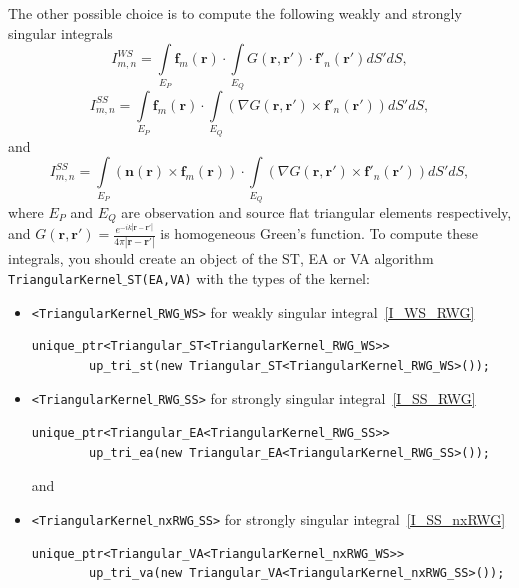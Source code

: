 \documentclass[a4wide,11pt]{article}
\renewcommand{\[}{\begin{equation}}
\renewcommand{\]}{\end{equation}}
\renewcommand{\{}{\begin{eqnarray}}
\renewcommand{\}}{\end{eqnarray}}
\renewcommand{\vec}{\mathbf}
\begin{document}
The other possible choice is to compute the following weakly and strongly singular integrals
\[
\label{I_WS_RWG}
I^{WS}_{m,n} = \int\limits_{E_P} \vec f_m(\vec r) \cdot\int\limits_{E_Q}  G(\vec r, \vec r') \cdot\vec f'_n(\vec r') dS' dS,
\]
\[
\label{I_SS_RWG}
I^{SS}_{m,n} = \int\limits_{E_P} \vec f_m(\vec r) \cdot\int\limits_{E_Q} (\nabla G(\vec r, \vec r') \times \vec f'_n(\vec r')) dS' dS,
\]
and
\[
\label{I_SS_nxRWG}
I^{SS}_{m,n} = \int\limits_{E_P} \left(\vec n(\vec r) \times\vec f_m(\vec r)\right) \cdot\int\limits_{E_Q} (\nabla G(\vec r, \vec r') \times \vec f'_n(\vec r')) dS' dS,
\]
where $E_P$ and $E_Q$ are observation and source flat triangular elements respectively, and $G(\vec r, \vec r') = \frac{e^{-ik|\vec r - \vec r'|}}{4\pi |\vec r - \vec r'|}$ is homogeneous Green's function. To compute these integrals, you should create an object of the ST, EA or VA algorithm \texttt{TriangularKernel$\_$ST(EA,VA)} with the types of the kernel: \\
\begin{itemize}
\item       
\texttt{<TriangularKernel$\_$RWG$\_$WS>} for weakly singular integral~\eqref{I_WS_RWG}
\begin{verbatim}
unique_ptr<Triangular_ST<TriangularKernel_RWG_WS>> 
        up_tri_st(new Triangular_ST<TriangularKernel_RWG_WS>());
\end{verbatim}
\item
\texttt{<TriangularKernel$\_$RWG$\_$SS>} for strongly singular integral~\eqref{I_SS_RWG}
\begin{verbatim}
unique_ptr<Triangular_EA<TriangularKernel_RWG_SS>> 
        up_tri_ea(new Triangular_EA<TriangularKernel_RWG_SS>());
\end{verbatim}
and
\item
\texttt{<TriangularKernel$\_$nxRWG$\_$SS>} for strongly singular integral~\eqref{I_SS_nxRWG}
\begin{verbatim}
unique_ptr<Triangular_VA<TriangularKernel_nxRWG_WS>> 
        up_tri_va(new Triangular_VA<TriangularKernel_nxRWG_SS>());
\end{verbatim}
\end{itemize}  
\end{document}
